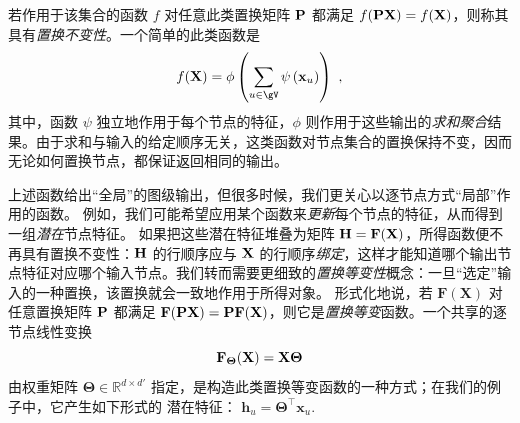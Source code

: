  
 


若作用于该集合的函数 $f$ 对任意此类置换矩阵 ${\bf P}$ 都满足 $f({\bf P}{\bf X}) = f({\bf X})$，则称其具有\emph{置换不变性}。一个简单的此类函数是
\begin{equation}
\label{eq:basicinv}
    f({\bf X}) = \phi\left(\sum_{u\in \gV} \psi\left(\mathbf{ x}_u\right)\right)~,
\end{equation}
其中，函数 $\psi$ 独立地作用于每个节点的特征，$\phi$ 则作用于这些输出的\emph{求和聚合}结果。由于求和与输入的给定顺序无关，这类函数对节点集合的置换保持不变，因而无论如何置换节点，都保证返回相同的输出。


 



上述函数给出“全局”的图级输出，但很多时候，我们更关心以逐节点方式“局部”作用的函数。
例如，我们可能希望应用某个函数来\emph{更新}每个节点的特征，从而得到一组\emph{潜在}节点特征。
%
如果把这些潜在特征堆叠为矩阵 $\mathbf{H} = \mathbf{F}({\bf X})$，所得函数便不再具有置换不变性：${\bf H}$ 的行顺序应与 ${\bf X}$ 的行顺序\emph{绑定}，这样才能知道哪个输出节点特征对应哪个输入节点。我们转而需要更细致的{\em 置换等变性}概念：一旦“选定”输入的一种置换，该置换就会一致地作用于所得对象。
%
形式化地说，若 $\mathbf{F}(\mathbf{X})$ 对任意置换矩阵 ${\bf P}$ 都满足 $\mathbf{F}({\bf P}{\bf X}) = {\bf P}\mathbf{F}({\bf X})$，则它是\emph{置换等变}函数。一个共享的逐节点线性变换
\begin{equation}
    \mathbf{F}_{\mathbf\Theta}({\bf X}) = {\bf X}{\mathbf \Theta}
\end{equation}
由权重矩阵 $\mathbf\Theta\in\mathbb{R}^{d\times d'}$ 指定，是构造此类置换等变函数的一种方式；在我们的例子中，它产生如下形式的
潜在特征：
$\mathbf{h}_u = \boldsymbol{\Theta}^\top\mathbf{x}_u$.

